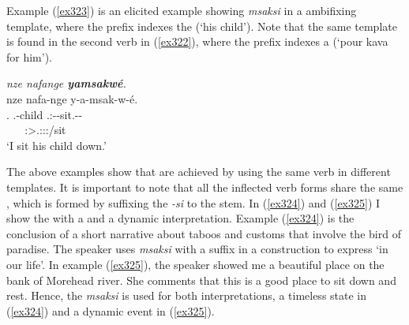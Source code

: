 Example (\ref{ex323}) is an elicited example showing \emph{msaksi} in a  ambifixing template, where the  prefix indexes the  (`his child'). Note that the same template is found in the second verb in (\ref{ex322}), where the  prefix indexes a  (`pour kava for him').

\begin{exe}
	\ex \textit{nze nafange \textbf{yamsakwé}.}\\
	\glll nze nafa-nge y-a-msak-w-é.\\
	 \Fsg{}.\Erg{} \Third.\Poss-child \Tsg{}.\Masc{}:\Alph{}-\Vc{}-sit.\Ext{}-\Ndu{}-\Fsg{}\\
	  ~ ~ {\Fsg:\Sbj>\Tsg.\Masc:\Io:\Nonpast:\Ipfv/sit}\\
	\trans `I sit his child down.'
	\label{ex323}
\end{exe}

The above examples show that  are achieved by using the same verb in different templates. It is important to note that all the inflected verb forms share the same , which is formed by suffixing the  \emph{-si} to the stem. In (\ref{ex324}) and (\ref{ex325}) I show the  with a  and a dynamic interpretation. Example (\ref{ex324}) is the conclusion of a short narrative about taboos and customs that involve the bird of paradise. The speaker uses \emph{msaksi} with a   suffix in a  construction to express `in our life'. In example (\ref{ex325}), the speaker showed me a beautiful place on the bank of Morehead river. She comments that this is a good place to sit down and rest. Hence, the  \emph{msaksi} is used for both interpretations, a timeless state in (\ref{ex324}) and a dynamic event in (\ref{ex325}).

